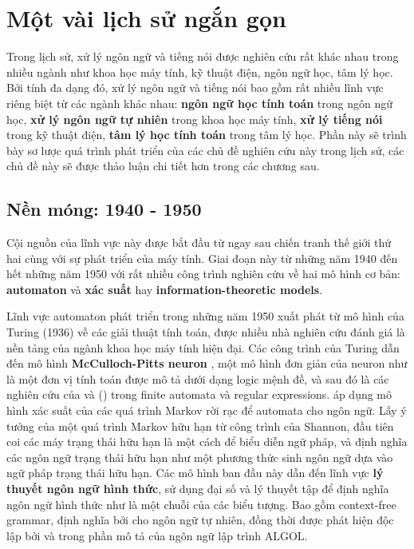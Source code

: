 \section{Một vài lịch sử ngắn gọn}

Trong lịch sử, xử lý ngôn ngữ và tiếng nói được nghiên cứu rất khác nhau trong nhiều ngành như khoa học máy tính, kỹ thuật điện, ngôn ngữ học, tâm lý học. Bởi tính đa dạng đó, xử lý ngôn ngữ và tiếng nói bao gồm rất nhiều lĩnh vực riêng biệt từ các ngành khác nhau: \textbf{ngôn ngữ học tính toán} trong ngôn ngữ học, \textbf{xử lý ngôn ngữ tự nhiên} trong khoa học máy tính, \textbf{xử lý tiếng nói} trong kỹ thuật điện, \textbf{tâm lý học tính toán} trong tâm lý học. Phần này sẽ trình bày sơ lược quá trình phát triển của các chủ đề nghiên cứu này trong lịch sử, các chủ đề này sẽ được thảo luận chi tiết hơn trong các chương sau.

\subsection{Nền móng: 1940 - 1950}

Cội nguồn của lĩnh vực này được bắt đầu từ ngay sau chiến tranh thế giới thứ hai cùng với sự phát triển của máy tính. Giai đoạn này từ những năm 1940 đến hết những năm 1950 với rất nhiều công trình nghiên cứu về hai mô hình cơ bản: \textbf{automaton} và \textbf{xác suất} hay \textbf{information-theoretic models}.

Lĩnh vực automaton phát triển trong những năm 1950 xuất phát từ mô hình của Turing (1936) về các giải thuật tính toán, được nhiều nhà nghiên cứu đánh giá là nền tảng của ngành khoa học máy tính hiện đại. Các công trình của Turing dẫn đến mô hình \textbf{McCulloch-Pitts neuron} \citep{mcculloch1943logical}, một mô hình đơn giản của neuron như là một đơn vị tính toán được mô tả dưới dạng logic mệnh đề, và sau đó là các nghiên cứu của \citet{kleene1951representation} và (\citeyear{Kleene56}) trong finite automata và regular expressions. \citet{shannon1948mathematical} áp dụng mô hình xác suất của các quá trình Markov rời rạc để automata cho ngôn ngữ. Lấy ý tưởng của một quá trình Markov hữu hạn từ công trình của Shannon, \citet{chomsky1956logical} đầu tiên coi các máy trạng thái hữu hạn là một cách để biểu diễn ngữ pháp, và định nghĩa các ngôn ngữ trạng thái hữu hạn như một phương thức sinh ngôn ngữ dựa vào ngữ pháp trạng thái hữu hạn. Các mô hình ban đầu này dẫn đến lĩnh vực \textbf{lý thuyết ngôn ngữ hình thức}, sử dụng đại số và lý thuyết tập để định nghĩa ngôn ngữ hình thức như là một chuỗi của các biểu tượng. Bao gồm context-free grammar, định nghĩa bởi \citet{chomsky1956logical} cho ngôn ngữ tự nhiên, đồng thời được phát hiện độc lập bởi \citet{Backus1959TheSA} và \citet{Backus1960ReportOT} trong phần mô tả của ngôn ngữ lập trình ALGOL.

